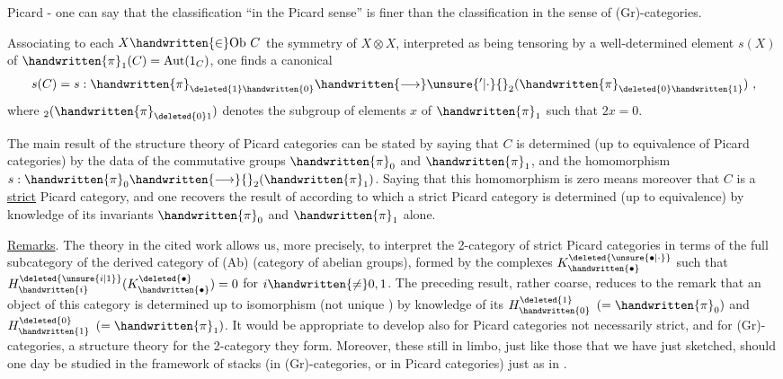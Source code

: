 
Picard - one can say that the classification ``in the Picard sense'' is finer than the classification in the sense of (Gr)-categories. 

Associating to each $X\handwritten{\in}\mathrm{Ob}\ C$ the symmetry of $X\otimes X$, interpreted as  being tensoring by a well-determined element $s(X)$ of $\handwritten{\pi}_{1}(C)=\mathrm{Aut}(1_C)$, one finds a canonical 
\[
s(C)=s:\handwritten{\pi}_{\deleted{1}\handwritten{0}}\handwritten{\longrightarrow}\unsure{{}'|\cdot}{}_{2}(\handwritten{\pi}_{\deleted{0}\handwritten{1}})\ ,
\]
where $ {}_{2}(\handwritten{\pi}_{\deleted{0}1})$ denotes the subgroup of elements $x$ of $\handwritten{\pi}_{1}$ such that $2x=0$.

The main result of the structure theory of Picard categories can be stated by saying that $C$ is determined (up to  equivalence of Picard categories) by the data of the commutative groups $\handwritten{\pi}_{0}$ and $\handwritten{\pi}_{1}$, and the homomorphism $s:\handwritten{\pi}_{0}\handwritten{\longrightarrow}{}_{2}(\handwritten{\pi}_{1})$. Saying that this homomorphism is zero means moreover that $C$ is a \uline{strict} Picard category, and one recovers the result of \handwritten{[\, ]} according to which a strict Picard category is determined (up to equivalence) by knowledge of its invariants $\handwritten{\pi}_{0}$ and $\handwritten{\pi}_{1}$ alone.

\uline{Remarks}. The theory in the cited work allows us, more precisely, to interpret the 2-category of strict Picard categories in terms of the full subcategory of the derived category of (Ab) (category of abelian groups), formed by the complexes $K^{\deleted{\unsure{\bullet|\cdot}}}_{\handwritten{\bullet}}$ such that $H^{\deleted{\unsure{i|1}}}_{\handwritten{i}}(K^{\deleted{\bullet}}_{\handwritten{\bullet}})=0$ for $i\handwritten{\ne}0,1$. The preceding result, rather coarse,  reduces to the remark that an object of this category is determined up to isomorphism (not unique \handwritten{!}) by knowledge of its $H^{\deleted{1}}_{\handwritten{0}}$ $(=\handwritten{\pi}_{0})$ and $H^{\deleted{0}}_{\handwritten{1}}$ $(=\handwritten{\pi}_{1})$. It would be appropriate to develop also for Picard categories not necessarily strict, and for (Gr)-categories, a structure theory for the 2-category they form. Moreover, these  still in limbo, just like those that  we have just sketched, should one day be  studied in the framework of stacks (in (Gr)-categories, or in Picard categories) just as in  \handwritten{[\, ]}.

